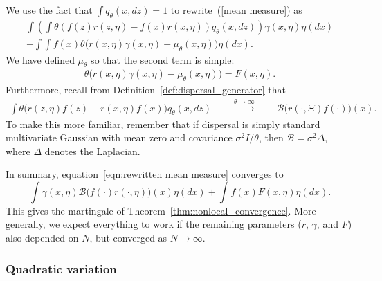 \documentclass[12pt]{article}
\newcommand{\DG}{\mathcal{B}}  %
\begin{document}
We use the fact that $\int q_\theta(x,dz)=1$ to rewrite~(\ref{mean measure})
as 
\begin{equation}
\label{eqn:rewritten mean measure}
\begin{split}
    \int\left(
        \int \theta \left( f(z) r(z,\eta)- f(x) r(x,\eta) \right) q_\theta(x,dz)
    \right)
    \gamma(x,\eta)
    \eta(dx)
    \\
    + \int \int f(x) \theta \Big(
        r(x,\eta) \gamma(x,\eta)
        - \mu_\theta(x,\eta)
    \Big) \eta(dx).
\end{split}
\end{equation}
We have defined $\mu_\theta$ so that the second term is simple:
\begin{align*}
    \theta \Big( r(x,\eta) \gamma(x,\eta) - \mu_\theta(x,\eta) \Big)
    = F(x, \eta) .
\end{align*}
Furthermore, recall from Definition~\ref{def:dispersal_generator} that
\begin{align} \label{eqn:near_critical}
    \int \theta \Big(
        r(z,\eta) f(z)
        -
        r(x,\eta) f(x)
    \Big) q_\theta(x,dz) 
    \qquad \stackrel{\theta\to\infty}{\longrightarrow} \qquad  
    \DG \big(r(\cdot,\Xi)f(\cdot)\big)(x) .
\end{align}
To make this more familiar,
remember that if dispersal is simply standard multivariate Gaussian
with mean zero and covariance $\sigma^2 I / \theta$,
then $\DG = \sigma^2 \Delta$, where $\Delta$ denotes the Laplacian.

In summary, equation~\eqref{eqn:rewritten mean measure} converges to
\begin{equation} \label{limit of mean measure equation}
\int \gamma(x,\eta)
\DG \big(f(\cdot)r(\cdot,\eta)\big)(x)
\eta(dx)
+
\int f(x)
F(x,\eta)
\eta(dx) .
\end{equation}
This gives the martingale of Theorem~\ref{thm:nonlocal_convergence}.
More generally, we expect everything to work
if the remaining parameters ($r$, $\gamma$, and $F$)
also depended on $N$, but converged as $N \to \infty$.


\subsubsection*{Quadratic variation}

\end{document}
